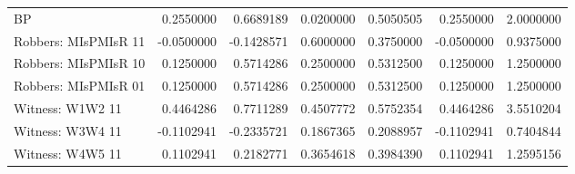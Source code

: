 \documentclass[10pt,]{scrartcl}
\begin{document}
\begin{table}[H]
\begin{tabular}{lrrrrrr}
\rowcolor{gray!6}  BP & 0.2550000 & 0.6689189 & 0.0200000 & 0.5050505 & 0.2550000 & 2.0000000\\
Robbers: MIsPMIsR 11 & -0.0500000 & -0.1428571 & 0.6000000 & 0.3750000 & -0.0500000 & 0.9375000\\
\rowcolor{gray!6}  Robbers: MIsPMIsR 10 & 0.1250000 & 0.5714286 & 0.2500000 & 0.5312500 & 0.1250000 & 1.2500000\\
Robbers: MIsPMIsR 01 & 0.1250000 & 0.5714286 & 0.2500000 & 0.5312500 & 0.1250000 & 1.2500000\\
\rowcolor{gray!6}  Witness: W1W2 11 & 0.4464286 & 0.7711289 & 0.4507772 & 0.5752354 & 0.4464286 & 3.5510204\\
Witness: W3W4 11 & -0.1102941 & -0.2335721 & 0.1867365 & 0.2088957 & -0.1102941 & 0.7404844\\
\rowcolor{gray!6}  Witness: W4W5 11 & 0.1102941 & 0.2182771 & 0.3654618 & 0.3984390 & 0.1102941 & 1.2595156\\
\bottomrule
\end{tabular}
\end{table}
\end{document}
